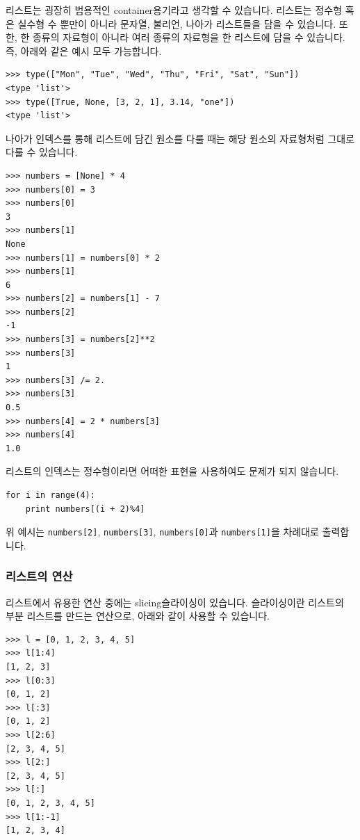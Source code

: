 \documentclass[../main.tex]{subfiles}
\begin{document}
리스트는 굉장히 범용적인 container용기라고 생각할 수 있습니다.
리스트는 정수형 혹은 실수형 수 뿐만이 아니라 문자열, 불리언, 나아가 리스트들을 담을 수 있습니다.
또한, 한 종류의 자료형이 아니라 여러 종류의 자료형을 한 리스트에 담을 수 있습니다.
즉, 아래와 같은 예시 모두 가능합니다.
\begin{verbatim}
>>> type(["Mon", "Tue", "Wed", "Thu", "Fri", "Sat", "Sun"])
<type 'list'>
>>> type([True, None, [3, 2, 1], 3.14, "one"])
<type 'list'>
\end{verbatim}
나아가 인덱스를 통해 리스트에 담긴 원소를 다룰 때는 해당 원소의 자료형처럼 그대로 다룰 수 있습니다.
\begin{verbatim}
>>> numbers = [None] * 4
>>> numbers[0] = 3
>>> numbers[0]
3
>>> numbers[1]
None
>>> numbers[1] = numbers[0] * 2
>>> numbers[1]
6
>>> numbers[2] = numbers[1] - 7
>>> numbers[2]
-1
>>> numbers[3] = numbers[2]**2
>>> numbers[3]
1
>>> numbers[3] /= 2.
>>> numbers[3]
0.5
>>> numbers[4] = 2 * numbers[3]
>>> numbers[4]
1.0
\end{verbatim}

리스트의 인덱스는 정수형이라면 어떠한 표현을 사용하여도 문제가 되지 않습니다.
\begin{verbatim}
for i in range(4):
	print numbers[(i + 2)%4]
\end{verbatim}
위 예시는 \texttt{numbers[2]}, \texttt{numbers[3]}, \texttt{numbers[0]}과 \texttt{numbers[1]}을 차례대로 출력합니다.

\subsubsection{리스트의 연산}
리스트에서 유용한 연산 중에는 slicing슬라이싱이 있습니다.
슬라이싱이란 리스트의 부분 리스트를 만드는 연산으로, 아래와 같이 사용할 수 있습니다.
\begin{verbatim}
>>> l = [0, 1, 2, 3, 4, 5]
>>> l[1:4]
[1, 2, 3]
>>> l[0:3]
[0, 1, 2]
>>> l[:3]
[0, 1, 2]
>>> l[2:6]
[2, 3, 4, 5]
>>> l[2:]
[2, 3, 4, 5]
>>> l[:]
[0, 1, 2, 3, 4, 5]
>>> l[1:-1]
[1, 2, 3, 4]
\end{verbatim}
\end{document}
